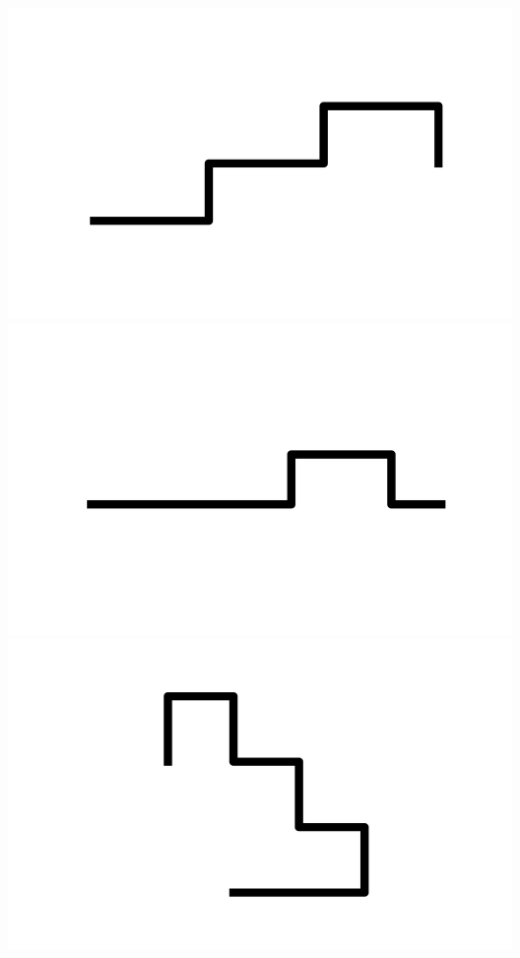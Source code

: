 \documentclass[]{report}
\begin{document}
\includegraphics[scale=.1]{pictures/21/state_cluster_shapes_421.pdf} 
\includegraphics[scale=.1]{pictures/21/state_cluster_shapes_422.pdf} 
\includegraphics[scale=.1]{pictures/21/state_cluster_shapes_423.pdf} 
\end{document}
